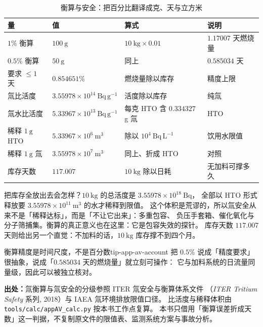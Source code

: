 \begin{table}[htbp]
\centering
\small
\caption{衡算与安全：把百分比翻译成克、天与立方米}
\label{tab:app-av-account}
\begin{tabular}{p{3.4cm}p{3.4cm}p{3.8cm}p{3.6cm}}
\hline
量 & 值 & 算式 & 说明 \\
\hline
$1\%$ 衡算 & $100\ \mathrm{g}$ & $10\ \mathrm{kg}\times0.01$ & $1.17007$ 天燃烧量 \\
$0.5\%$ 衡算 & $50\ \mathrm{g}$ & 同上 & $0.585034$ 天 \\
要求 $\le1$ 天 & $0.854651\%$ & 燃烧量除以库存 & 精度上限 \\
氚比活度 & $3.55978\times10^{14}\ \mathrm{Bq\,g^{-1}}$ & 活度除以库存 & 纯氚 \\
氚水比活度 & $5.33967\times10^{13}\ \mathrm{Bq\,g^{-1}}$ & 每克 HTO 含 $0.334327$ g 氚 & HTO \\
稀释 $1\ \mathrm{g}$ HTO & $5.33967\times10^{6}\ \mathrm{m^{3}}$ & 除以 $10^{4}\ \mathrm{Bq\,L^{-1}}$ & 饮用水限值 \\
稀释 $1\ \mathrm{g}$ 氚 & $3.55978\times10^{7}\ \mathrm{m^{3}}$ & 同上、折成 HTO & 对照 \\
库存天数 & $117.007$ & $10\ \mathrm{kg}$ 除以日耗 & 无加料可撑多久 \\
\hline
\end{tabular}
\end{table}

把库存全放出去会怎样？$10\ \mathrm{kg}$ 的总活度是 $3.55978\times10^{18}\ \mathrm{Bq}$，
全部以 HTO 形式释放要 $3.55978\times10^{11}\ \mathrm{m^{3}}$ 的水才稀释到限值。
这个体积是荒谬的，所以氚安全从来不是「稀释达标」，而是「不让它出来」：多重包容、
负压手套箱、催化氧化与分子筛捕集。衡算的真正意义也在这里：它是包容失效的探针。
库存天数 $117.007$ 天则给出另一个直觉：不加料的话，$10\ \mathrm{kg}$ 库存撑不到四个月。

\begin{tip}{衡算精度是时间尺度，不是百分数}{tip-app-av-account}
把 $0.5\%$ 说成「精度要求」很抽象，说成「$0.585034$ 天的燃烧量」就立刻可操作：
它与加料系统的日流量同量级，因此可以被独立核对。
\end{tip}

{\footnotesize
\textbf{出处：}氚衡算与氚安全的分级参照 ITER 氚安全与衡算体系文件
（\emph{ITER Tritium Safety} 系列, 2018）与 IAEA 氚环境排放限值口径。
比活度与稀释体积由 \texttt{tools/\allowbreak{}calc/\allowbreak{}appAV\_calc.py} 按本书工作点复算。
本书只借用「衡算误差折成天数」这一判据，不复制原文件的限值表、监测系统方案与事故分析。
}


